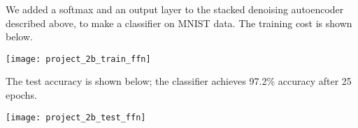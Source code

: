 We added a softmax and an output layer to the stacked denoising autoencoder
described above, to make a classifier on MNIST data. The training cost is shown 
below.

\begin{center}
    \texttt{[image: project\_2b\_train\_ffn]}
\end{center}

The test accuracy is shown below; the classifier achieves 97.2\% accuracy after
25 epochs.

\begin{center}
    \texttt{[image: project\_2b\_test\_ffn]}
\end{center}